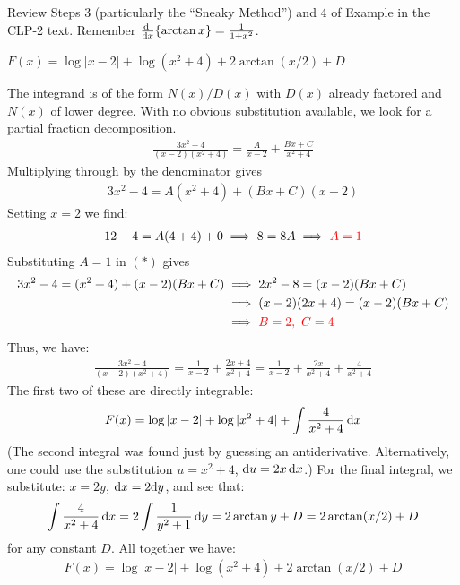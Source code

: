 \begin{hint}
Review Steps 3 (particularly the ``Sneaky Method'') and 4 of
Example 
in the %
CLP-2 text. Remember $\diff{}{x}\{\arctan x\} = \frac{1}{1+x^2}$.
\end{hint}

\begin{answer}
$ F(x) = \log |x-2| + \log (x^2+4) + 2\arctan (x/2) + D$
\end{answer}

\begin{solution}
The integrand is of the form $N(x)/D(x)$ with $D(x)$ already factored
and $N(x)$ of lower degree. With no obvious substitution available, we look for a partial fraction decomposition.
\begin{align*}
\frac{3x^2 -4}{(x-2)(x^2+4)} = \frac{A}{x-2} + \frac{Bx + C}{x^2+4}
\end{align*}
Multiplying through by the denominator gives
\begin{align}
3x^2 -4 = A(x^2+4) + (Bx + C)(x-2)
\tag{$*$}
\end{align}
Setting $x=2$ we find:
\begin{align*}
   12 -4 = A(4 + 4) + 0 \implies 8 =8A  \implies \color{red}A = 1
\end{align*}
Substituting $A=1$ in $(*)$ gives
\begin{align*}
 3x^2 -4  = (x^2+4) + (x-2)(Bx + C)
  &\implies   2x^2-8 =(x-2)(Bx + C) \\
  &\implies   (x-2)(2x+4)=(x-2)(Bx + C) \\
  & \implies \color{red} B=2,~C=4
\end{align*}
Thus, we have:
\begin{align*}
 \frac{3x^2 -4}{(x-2)(x^2+4)} = \frac{1}{x-2} + \frac{2x + 4}{x^2+4} = \frac{1}{x-2} + \frac{2x }{x^2+4} + \frac{4}{x^2+4 }
\end{align*}
The first two of these are directly integrable:
\begin{align*}
  F(x) = \log |x-2| + \log |x^2+4| + \int \frac{4}{x^2+4}\,\mathrm{d}x
\end{align*}
(The second integral was found just by guessing an antiderivative.
Alternatively, one could use the substitution $u=x^2+4$, $\mathrm{d}u=2x\,\mathrm{d}x$.)
For the final integral, we substitute: $x = 2y$,
$\mathrm{d}x = 2\mathrm{d}y$, and see that:
\begin{align*}
  \int \frac{4}{x^2+4}\,\mathrm{d}x  = 2 \int \frac{1}{y^2 + 1}\,\mathrm{d}y = 2 \arctan y + D = 2\arctan (x/2) + D
\end{align*}
for any constant $D$. All together we have:
\begin{align*}
   F(x) = \log |x-2| + \log (x^2+4) + 2\arctan (x/2) + D
\end{align*}
\end{solution}

